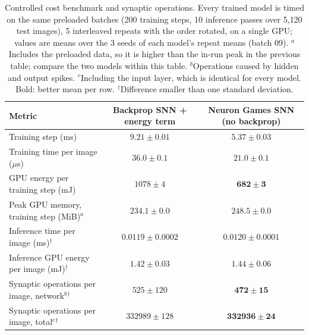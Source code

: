 \documentclass{article}
\begin{document}
\begin{table}[H]
\centering
\small
\caption{Controlled cost benchmark and synaptic operations. Every trained model is timed on the same preloaded batches (200 training steps, 10 inference passes over 5{,}120 test images), 5 interleaved repeats with the order rotated, on a single GPU; values are means over the 3 seeds of each model's repeat means (batch 09). $^a$Includes the preloaded data, so it is higher than the in-run peak in the previous table; compare the two models within this table. $^b$Operations caused by hidden and output spikes. $^c$Including the input layer, which is identical for every model. Bold: better mean per row. $^\dagger$Difference smaller than one standard deviation.}
\label{tab:t2-bench}
\begin{tabular}{lcc}
\toprule
Metric & Backprop SNN + energy term & Neuron Games SNN (no backprop) \\
\midrule
Training step (ms) & $9.21 \pm 0.01$ & $\boldsymbol{5.37 \pm 0.03}$ \\
Training time per image ($\mu$s) & $36.0 \pm 0.1$ & $\boldsymbol{21.0 \pm 0.1}$ \\
GPU energy per training step (mJ) & $1078 \pm 4$ & $\boldsymbol{682 \pm 3}$ \\
Peak GPU memory, training step (MiB)$^a$ & $\boldsymbol{234.1 \pm 0.0}$ & $248.5 \pm 0.0$ \\
Inference time per image (ms)$^\dagger$ & $\boldsymbol{0.0119 \pm 0.0002}$ & $0.0120 \pm 0.0001$ \\
Inference GPU energy per image (mJ)$^\dagger$ & $\boldsymbol{1.42 \pm 0.03}$ & $1.44 \pm 0.06$ \\
\midrule
Synaptic operations per image, network$^b$$^\dagger$ & $525 \pm 120$ & $\boldsymbol{472 \pm 15}$ \\
Synaptic operations per image, total$^c$$^\dagger$ & $332989 \pm 128$ & $\boldsymbol{332936 \pm 24}$ \\
\bottomrule
\end{tabular}
\end{table}
\end{document}

